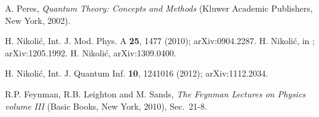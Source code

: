 \documentclass[12pt]{article}
\begin{document}
\begin{thebibliography}{99}
A. Peres, {\it Quantum Theory: Concepts and Methods} (Kluwer Academic Publishers, New York, 2002).

H. Nikoli\'c, Int. J. Mod. Phys. A {\bf 25}, 1477 (2010); arXiv:0904.2287.
H. Nikoli\'c, in \cite{oriols}; arXiv:1205.1992.
H. Nikoli\'c, arXiv:1309.0400.

H. Nikoli\'c, Int. J. Quantum Inf. {\bf 10}, 1241016 (2012); arXiv:1112.2034.

R.P. Feynman, R.B. Leighton and M. Sands, 
{\it The Feynman Lectures on Physics volume III} (Basic Books, New York, 2010), Sec.~21-8.


\end{thebibliography}
\end{document}
